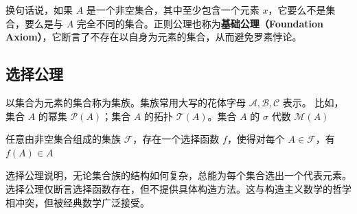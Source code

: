 \begin{note}
    换句话说，如果 $ A $ 是一个非空集合，其中至少包含一个元素 $ x $，它要么不是集合，要么是与 $ A $ 完全不同的集合。正则公理也称为\textbf{基础公理（Foundation Axiom）}，它断言了不存在以自身为元素的集合，从而避免罗素悖论。
\end{note}
\newpage

\subsection{选择公理}

\begin{definition}
    以集合为元素的集合称为集族。集族常用大写的花体字母 $\mathcal{A,B,C}$ 表示。
    比如，集合 $ A $ 的幂集 $ \mathcal{P}(A) $；集合 $ A $ 的拓扑 $ \mathcal{T}(A) $。集合 $ A $ 的 $ \sigma $ 代数 $ \mathcal{M}(A) $ 
\end{definition}
\vspace{1em}

\begin{axiom}
    任意由非空集合组成的集族 $ \mathcal{F} $，存在一个选择函数 $ f $，使得对每个 $ A\in\mathcal{F} $，有 $ f(A)\in A $
\end{axiom}

\begin{note}
    选择公理说明，无论集合族的结构如何复杂，总能为每个集合选出一个代表元素。选择公理仅断言选择函数存在，但不提供具体构造方法。这与构造主义数学的哲学相冲突，但被经典数学广泛接受。
\end{note}
\newpage